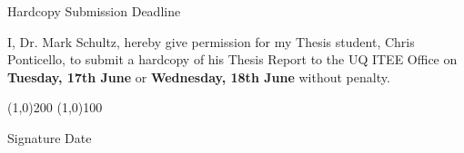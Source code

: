\documentclass[a4paper]{article}
\begin{document}
{\huge Hardcopy Submission Deadline}

\vspace{2 cm}

\large
I, Dr. Mark Schultz, hereby give permission for my Thesis student, Chris Ponticello, to submit a hardcopy of his Thesis Report to the UQ ITEE Office on \textbf{Tuesday, 17th June} or \textbf{Wednesday, 18th June} without penalty.
\\

\vspace{2 cm}

\line(1,0){200} \hspace{1 cm} \line(1,0){100}

Signature \hspace{6.5 cm} Date
\end{document}
